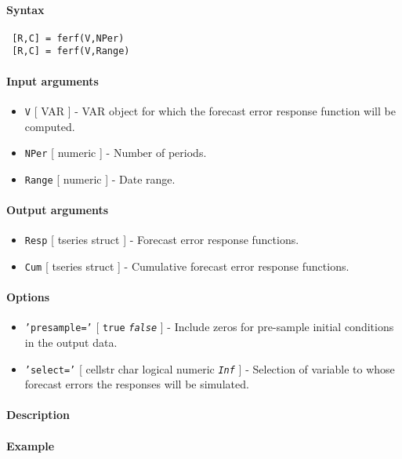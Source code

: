 


	\paragraph{Syntax}
 
 \begin{verbatim}
 [R,C] = ferf(V,NPer)
 [R,C] = ferf(V,Range)
 \end{verbatim}
 
 \paragraph{Input arguments}
 
 \begin{itemize}
 \item
   \texttt{V} {[} VAR {]} - VAR object for which the forecast error
   response function will be computed.
 \item
   \texttt{NPer} {[} numeric {]} - Number of periods.
 \item
   \texttt{Range} {[} numeric {]} - Date range.
 \end{itemize}
 
 \paragraph{Output arguments}
 
 \begin{itemize}
 \item
   \texttt{Resp} {[} tseries \textbar{} struct {]} - Forecast error
   response functions.
 \item
   \texttt{Cum} {[} tseries \textbar{} struct {]} - Cumulative forecast
   error response functions.
 \end{itemize}
 
 \paragraph{Options}
 
 \begin{itemize}
 \item
   \texttt{'presample='} {[} \texttt{true} \textbar{}
   \emph{\texttt{false}} {]} - Include zeros for pre-sample initial
   conditions in the output data.
 \item
   \texttt{'select='} {[} cellstr \textbar{} char \textbar{} logical
   \textbar{} numeric \textbar{} \emph{\texttt{Inf}} {]} - Selection of
   variable to whose forecast errors the responses will be simulated.
 \end{itemize}
 
 \paragraph{Description}
 
 \paragraph{Example}


